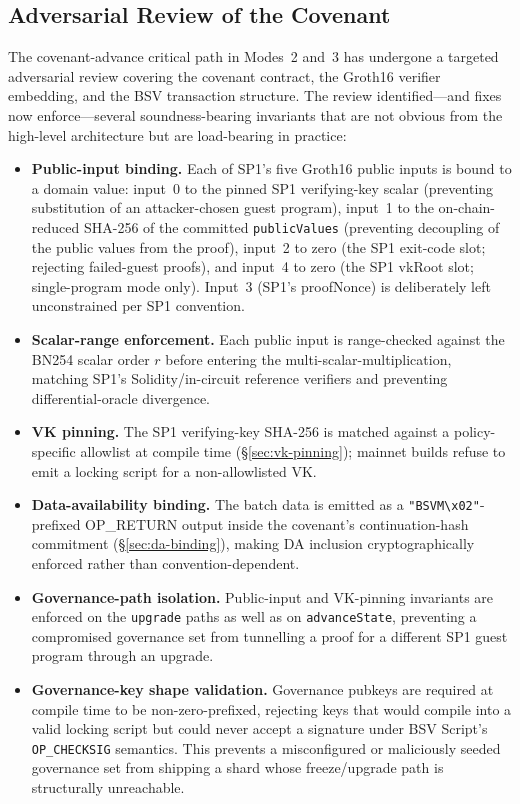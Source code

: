 \documentclass[11pt,twocolumn]{article}
\begin{document}
\subsection{Adversarial Review of the Covenant}
\label{sec:adversarial-review}

The covenant-advance critical path in Modes~2 and~3 has undergone a targeted adversarial review covering the covenant contract, the Groth16 verifier embedding, and the BSV transaction structure. The review identified---and fixes now enforce---several soundness-bearing invariants that are not obvious from the high-level architecture but are load-bearing in practice:

\begin{itemize}[nosep,leftmargin=1.5em]
\item \textbf{Public-input binding.} Each of SP1's five Groth16 public inputs is bound to a domain value: input~0 to the pinned SP1 verifying-key scalar (preventing substitution of an attacker-chosen guest program), input~1 to the on-chain-reduced SHA-256 of the committed \texttt{publicValues} (preventing decoupling of the public values from the proof), input~2 to zero (the SP1 exit-code slot; rejecting failed-guest proofs), and input~4 to zero (the SP1 vkRoot slot; single-program mode only). Input~3 (SP1's proofNonce) is deliberately left unconstrained per SP1 convention.
\item \textbf{Scalar-range enforcement.} Each public input is range-checked against the BN254 scalar order $r$ before entering the multi-scalar-multiplication, matching SP1's Solidity/in-circuit reference verifiers and preventing differential-oracle divergence.
\item \textbf{VK pinning.} The SP1 verifying-key SHA-256 is matched against a policy-specific allowlist at compile time (\S\ref{sec:vk-pinning}); mainnet builds refuse to emit a locking script for a non-allowlisted VK.
\item \textbf{Data-availability binding.} The batch data is emitted as a \texttt{"BSVM\textbackslash x02"}-prefixed OP\_RETURN output inside the covenant's continuation-hash commitment (\S\ref{sec:da-binding}), making DA inclusion cryptographically enforced rather than convention-dependent.
\item \textbf{Governance-path isolation.} Public-input and VK-pinning invariants are enforced on the \texttt{upgrade} paths as well as on \texttt{advanceState}, preventing a compromised governance set from tunnelling a proof for a different SP1 guest program through an upgrade.
\item \textbf{Governance-key shape validation.} Governance pubkeys are required at compile time to be non-zero-prefixed, rejecting keys that would compile into a valid locking script but could never accept a signature under BSV Script's \texttt{OP\_CHECKSIG} semantics. This prevents a misconfigured or maliciously seeded governance set from shipping a shard whose freeze/upgrade path is structurally unreachable.
\end{itemize}
\end{document}

